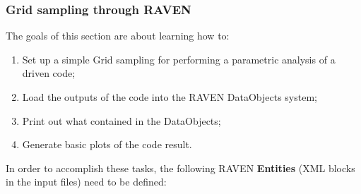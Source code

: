 \subsubsection{Grid sampling through RAVEN}
\label{subsub:Gridexample}
The goals of this section are about learning how to:
 \begin{enumerate}
   \item Set up a simple Grid sampling for performing a parametric analysis of a driven code;
   \item Load the outputs of the code into the RAVEN DataObjects system;
   \item Print out what contained in the DataObjects;
   \item Generate basic plots of the code result.
\end{enumerate}  
In order to accomplish these tasks, the following RAVEN \textbf{Entities} (XML blocks in the input files) need to be defined:

